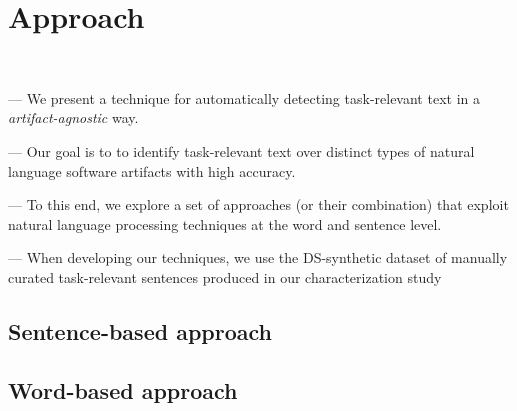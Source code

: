 \section{Approach}
\label{cp5:approaches}
\textcolor{white}{force ident} %

--- We present a technique for automatically detecting task-relevant text in a \textit{artifact-agnostic} way. \vspace{3mm}

--- Our goal is to to identify task-relevant text over distinct types of natural language software artifacts with high accuracy.  \vspace{3mm}

--- To this end, we explore a set of approaches (or their combination)
that exploit 
natural language processing techniques at 
the word and sentence level.  \vspace{3mm}


--- When developing our techniques, we use the \acs{DS-synthetic} dataset of manually curated task-relevant sentences produced in our characterization study~\cite{marques2020} \vspace{3mm}


\subsection{Sentence-based approach}








\subsection{Word-based approach}





